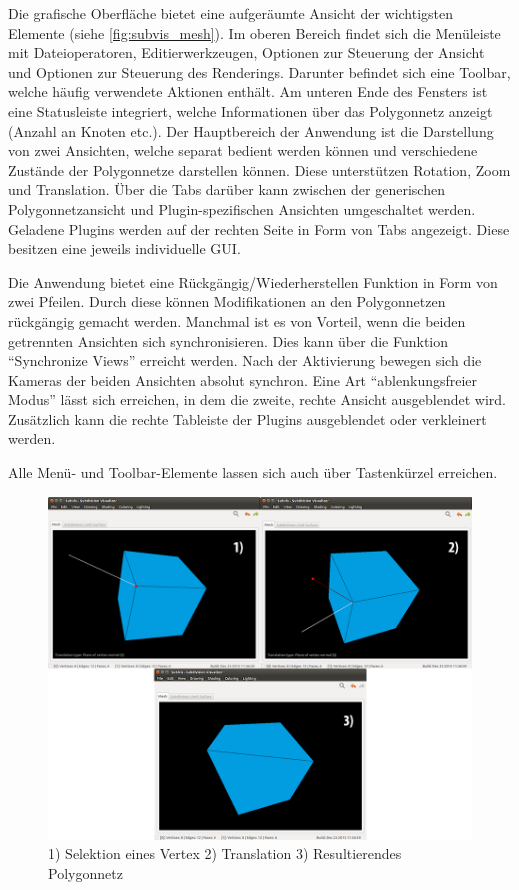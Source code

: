 Die grafische Oberfläche bietet eine aufgeräumte Ansicht der wichtigsten Elemente (siehe \autoref{fig:subvis_mesh}). 
Im oberen Bereich findet sich die Menüleiste mit Dateioperatoren, Editierwerkzeugen, Optionen zur Steuerung der Ansicht und Optionen zur Steuerung des Renderings.
Darunter befindet sich eine Toolbar, welche häufig verwendete Aktionen enthält.
Am unteren Ende des Fensters ist eine Statusleiste integriert, welche Informationen über das Polygonnetz anzeigt (Anzahl an Knoten etc.).
Der Hauptbereich der Anwendung ist die Darstellung von zwei Ansichten, welche separat bedient werden können und verschiedene Zustände der Polygonnetze darstellen können.
Diese unterstützen Rotation, Zoom und Translation.
Über die Tabs darüber kann zwischen der generischen Polygonnetzansicht und Plugin-spezifischen Ansichten umgeschaltet werden.
Geladene Plugins werden auf der rechten Seite in Form von Tabs angezeigt.
Diese besitzen eine jeweils individuelle GUI.

Die Anwendung bietet eine Rückgängig/Wiederherstellen Funktion in Form von zwei Pfeilen. Durch diese können Modifikationen an den Polygonnetzen rückgängig gemacht werden.
Manchmal ist es von Vorteil, wenn die beiden getrennten Ansichten sich synchronisieren.
Dies kann über die Funktion \enquote{Synchronize Views} erreicht werden. 
Nach der Aktivierung bewegen sich die Kameras der beiden Ansichten  absolut synchron.
Eine Art \enquote{ablenkungsfreier Modus} lässt sich erreichen, in dem die zweite, rechte Ansicht ausgeblendet wird. 
Zusätzlich kann die rechte Tableiste der Plugins ausgeblendet oder verkleinert werden.

Alle Menü- und Toolbar-Elemente lassen sich auch über Tastenkürzel erreichen.

\begin{figure}
  \centering
  \includegraphics[width=\textwidth]{content/media/subvis_edit.png}
  \caption{1) Selektion eines Vertex 2) Translation 3) Resultierendes Polygonnetz}
  \label{fig:subvis_edit}
\end{figure}


